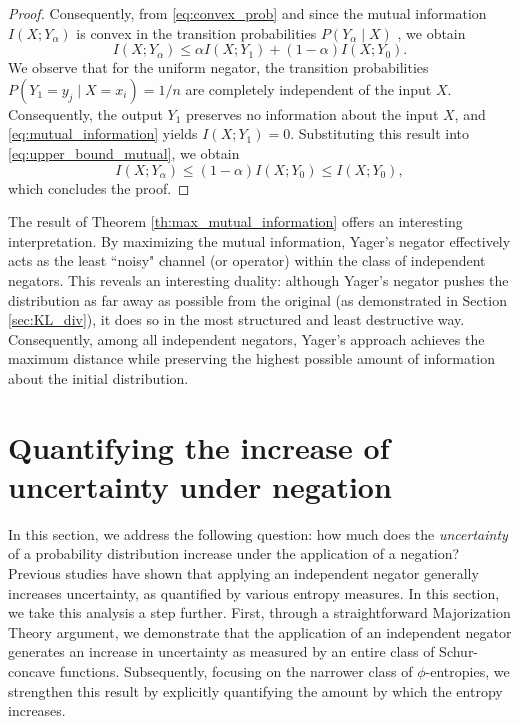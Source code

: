\documentclass[pdflatex,sn-basic,iicol]{sn-jnl}%
\theoremstyle{thmstyleone}%
\theoremstyle{thmstyletwo}%
\theoremstyle{thmstylethree}%
\begin{document}
\begin{proof}
    Consequently, from \eqref{eq:convex_prob} and since the mutual information $I(X;Y_\alpha)$ is convex in the transition probabilities $P(Y_\alpha\mid X)$ \cite[Theorem 1.7]{mceliece2002theory}, we obtain
    \begin{equation}\label{eq:upper_bound_mutual}
        I(X;Y_\alpha)\leq \alpha I(X;Y_1) + (1-\alpha)I(X;Y_0).
    \end{equation}
    We observe that for the uniform negator, the transition probabilities $P(Y_1=y_j\mid X=x_i) = 1/n$ are completely independent of the input $X$. Consequently, the output $Y_1$  preserves no information about the input $X$, and \eqref{eq:mutual_information}  yields $I(X;Y_1)=0$. Substituting this result into \eqref{eq:upper_bound_mutual},  we obtain
    \begin{equation*}
        I(X;Y_\alpha)\leq (1-\alpha)I(X;Y_0)\leq I(X;Y_0),
    \end{equation*}
    which concludes the proof.
\end{proof}

The result of Theorem \ref{th:max_mutual_information} offers an interesting interpretation. By maximizing the mutual information, Yager's negator effectively acts as the least ``noisy" channel (or operator) within the class of independent negators. This reveals an interesting duality: although Yager's negator pushes the distribution as far away as possible from the original (as demonstrated in Section \ref{sec:KL_div}), it does so in the most structured and least destructive way. Consequently, among all independent negators, Yager's approach achieves the maximum distance while preserving the highest possible amount of information about the initial distribution.

\section{Quantifying the increase of uncertainty under negation}\label{sec:increasing}

In this section, we address the following question: how much does the \textit{uncertainty} of a probability distribution increase under the application of a negation? Previous studies \citep{klein2022some,Yager2015} have shown that applying an independent negator generally increases uncertainty, as quantified by various entropy measures. In this section,
we take this analysis a step further. First, through a straightforward Majorization Theory argument, we demonstrate that the application of an independent negator generates an increase in uncertainty 
as measured by an entire class of Schur-concave functions. Subsequently, focusing on the narrower class of $\phi$-entropies, we strengthen this result by explicitly quantifying the amount by which the entropy increases.
\end{document}
